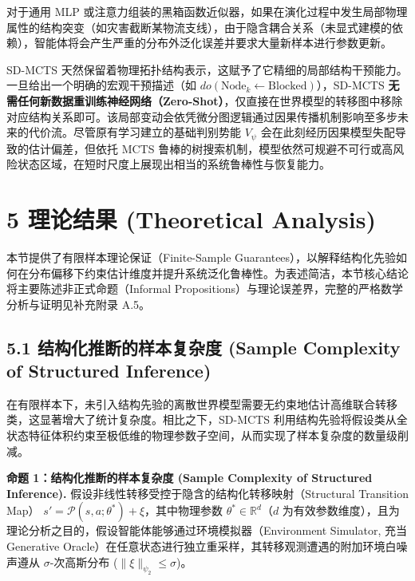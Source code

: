 \documentclass[UTF8]{ctexart}
\begin{document}
对于通用 MLP 或注意力组装的黑箱函数近似器，如果在演化过程中发生局部物理属性的结构突变（如灾害截断某物流支线），由于隐含耦合关系（未显式建模的依赖），智能体将会产生严重的分布外泛化误差并要求大量新样本进行参数更新。

SD-MCTS 天然保留着物理拓扑结构表示，这赋予了它精细的局部结构干预能力。一旦给出一个明确的宏观干预描述（如 $do(\text{Node}_k \leftarrow \text{Blocked})$），SD-MCTS \textbf{无需任何新数据重训练神经网络（Zero-Shot）}，仅直接在世界模型的转移图中移除对应结构关系即可。该局部变动会依凭微分图逻辑通过因果传播机制影响至多步未来的代价流。尽管原有学习建立的基础判别势能 $V_\psi$ 会在此刻经历因果模型失配导致的估计偏差，但依托 MCTS 鲁棒的树搜索机制，模型依然可规避不可行或高风险状态区域，在短时尺度上展现出相当的系统鲁棒性与恢复能力。

\hypertarget{ux7406ux8bbaux7ed3ux679c-theoretical-analysis}{%
\section{5 理论结果 (Theoretical
Analysis)}\label{ux7406ux8bbaux7ed3ux679c-theoretical-analysis}}

本节提供了有限样本理论保证（Finite-Sample Guarantees），以解释结构化先验如何在分布偏移下约束估计维度并提升系统泛化鲁棒性。为表述简洁，本节核心结论将主要陈述非正式命题（Informal Propositions）与理论误差界，完整的严格数学分析与证明见补充附录 A.5。

\hypertarget{ux7ed3ux6784ux5316ux63a8ux65adux7684ux6837ux672cux590dux6742ux5ea6-sample-complexity-of-structured-inference}{%
\subsection{5.1 结构化推断的样本复杂度 (Sample Complexity of Structured
Inference)}\label{ux7ed3ux6784ux5316ux63a8ux65adux7684ux6837ux672cux590dux6742ux5ea6-sample-complexity-of-structured-inference}}

在有限样本下，未引入结构先验的离散世界模型需要无约束地估计高维联合转移类，这显著增大了统计复杂度。相比之下，SD-MCTS 利用结构先验将假设类从全状态特征体积约束至极低维的物理参数子空间，从而实现了样本复杂度的数量级削减。

\textbf{命题 1：结构化推断的样本复杂度 (Sample Complexity of Structured Inference). }
假设非线性转移受控于隐含的结构化转移映射（Structural Transition Map）
\(s' = \mathcal{P}(s, a ; \theta^*) + \xi\)，其中物理参数
\(\theta^* \in \mathbb{R}^d\)（\(d\) 为有效参数维度），且为理论分析之目的，假设智能体能够通过环境模拟器（Environment Simulator, 充当 Generative Oracle）在任意状态进行独立重采样，其转移观测遭遇的附加环境白噪声遵从
\(\sigma\)-次高斯分布 (\(\|\xi\|_{\psi_2} \leq \sigma\))。
\end{document}
